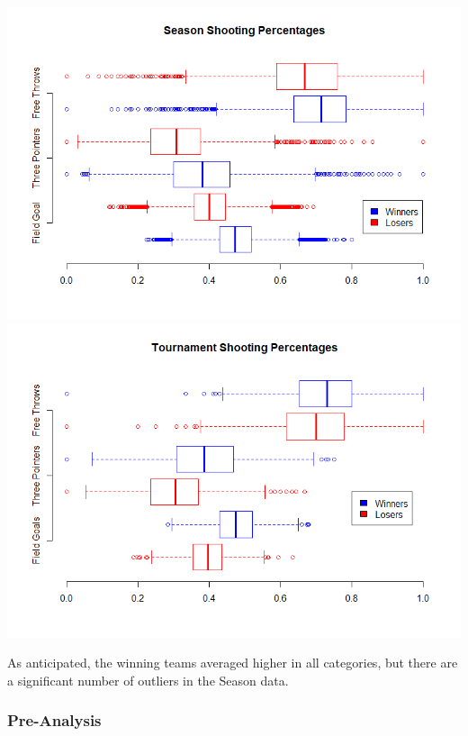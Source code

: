 \documentclass[11pt]{beamer}
\begin{document}
\begin{frame}
\begin{center}
	\includegraphics[scale=0.255]{SeasonShotPercent.png}
	\includegraphics[scale=0.255]{TourneyShotPercent.png}  
\end{center}
\footnotesize \center As anticipated, the winning teams averaged higher in all categories, but there are a significant number of outliers in the Season data.
\frametitle{{\textbf{\huge Pre-Analysis}}}
\end{frame}
\end{document}
